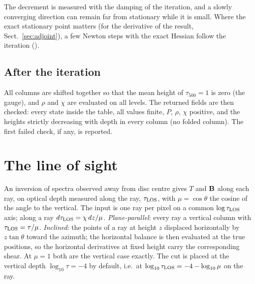 The decrement is measured with the damping of the iteration, and a slowly converging direction can remain far from stationary
while it is small. Where the exact stationary point matters (for the derivative of the result,
Sect.~\ref{sec:adjoint}), a few Newton steps with the exact Hessian follow the iteration ().

\subsection{After the iteration}
All columns are shifted together so that the mean height of $\tau_{500}=1$ is zero (the gauge), and $\rho$ and $\chi$ are
evaluated on all levels. The returned fields are then checked: every state inside the table, all values finite, $P$, $\rho$,
$\chi$ positive, and the heights strictly decreasing with depth in every column (no folded column). The first failed check,
if any, is reported.

\section{The line of sight}\label{sec:view}
An inversion of spectra observed away from disc centre gives $T$ and $\mathbf B$ along each ray, on optical depth measured along the ray,
$\tau_{\rm LOS}$, with $\mu=\cos\theta$ the cosine of the angle to the vertical. The input is one ray per pixel on a common
$\log\tau_{\rm LOS}$ axis; along a ray $d\tau_{\rm LOS}=\chi\,dz/\mu$. \emph{Plane-parallel}: every ray a vertical column with
$\tau_{\rm LOS}=\tau/\mu$. \emph{Inclined}: the points of a ray at height $z$ displaced horizontally by $z\tan\theta$ toward the
azimuth; the horizontal balance is then evaluated at the true positions, so the horizontal derivatives at fixed height carry the
corresponding shear. At $\mu=1$ both are the vertical case exactly. The cut is placed at the vertical depth $\log_{10}\tau=-4$
by default, i.e.\ at $\log_{10}\tau_{\rm LOS}=-4-\log_{10}\mu$ on the ray.

